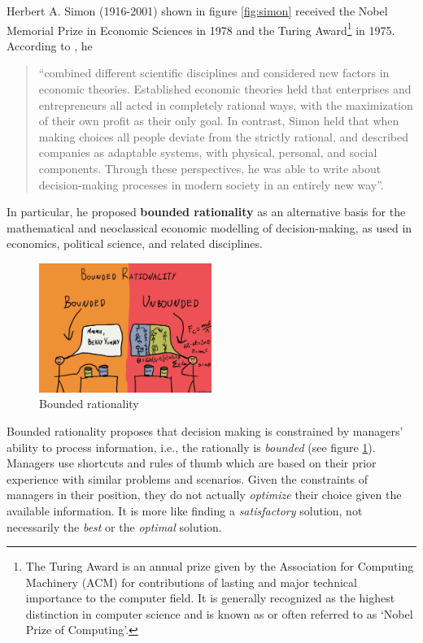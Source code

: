 \documentclass[
  12pt,
  oneside]{book}
\theoremstyle{definition}
\theoremstyle{definition}
\theoremstyle{definition}
\theoremstyle{definition}
\theoremstyle{remark}
\begin{document}
Herbert A. Simon (1916-2001) shown in figure \ref{fig:simon} received the Nobel Memorial Prize in Economic Sciences in 1978 and the Turing Award\footnote{The Turing Award is an annual prize given by the Association for Computing Machinery (ACM) for contributions of lasting and major technical importance to the computer field. It is generally recognized as the highest distinction in computer science and is known as or often referred to as `Nobel Prize of Computing'.} in 1975. According to \citet{NobelPrize.org2021Herbert}, he

\begin{quote}
``combined different scientific disciplines and considered new factors in economic theories. Established economic theories held that enterprises and entrepreneurs all acted in completely rational ways, with the maximization of their own profit as their only goal. In contrast, Simon held that when making choices all people deviate from the strictly rational, and described companies as adaptable systems, with physical, personal, and social components. Through these perspectives, he was able to write about decision-making processes in modern society in an entirely new way''.
\end{quote}

In particular, he proposed \textbf{bounded rationality} as an alternative basis for the mathematical and neoclassical economic modelling of decision-making, as used in economics, political science, and related disciplines.

\begin{figure}
\centering
\includegraphics[width=0.5\textwidth,height=\textheight]{fig/bounded-rationality.jpg}
\caption[\label{fig:boundedrationality} Bounded rationality]{\label{fig:boundedrationality} Bounded rationality\footnotemark{}}
\end{figure}

Bounded rationality proposes that decision making is constrained by managers' ability to process information, i.e., the rationally is \emph{bounded} (see figure \ref{fig:boundedrationality}). Managers use shortcuts and rules of thumb which are based on their prior experience with similar problems and scenarios. Given the constraints of managers in their position, they do not actually \emph{optimize} their choice given the available information. It is more like finding a \emph{satisfactory} solution, not necessarily the \emph{best} or the \emph{optimal} solution.
\end{document}
